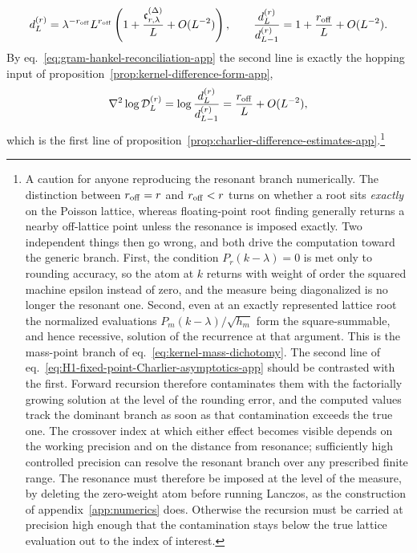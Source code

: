 \documentclass[a4paper,11pt]{article}
\theoremstyle{definition}
\theoremstyle{remark}
\begin{document}
\begin{equation}
   d_L^{(r)}
   =\lambda^{-r_{\rm off}}L^{r_{\rm off}}
   \left(
      1+\frac{\mathfrak c_{r,\lambda}^{(\Delta)}}{L}+O(L^{-2})
   \right),
   \qquad
   \frac{d_L^{(r)}}{d_{L-1}^{(r)}}
   =1+\frac{r_{\rm off}}{L}+O(L^{-2}).
   \label{eq:H1-Delta-ratio-asymptotics-app}
\end{equation}
By eq.~\eqref{eq:gram-hankel-reconciliation-app} the second line is exactly the hopping
input of proposition~\ref{prop:kernel-difference-form-app},
\begin{equation}
   \nabla^2\log\mathcal D_L^{(r)}
   =\log\frac{d_L^{(r)}}{d_{L-1}^{(r)}}
   =\frac{r_{\rm off}}{L}+O(L^{-2}),
   \label{eq:kernel-second-difference-charlier-app}
\end{equation}
which is the first line of proposition~\ref{prop:charlier-difference-estimates-app}.\footnote{A caution for anyone reproducing the resonant branch numerically.
The distinction between $r_{\rm off}=r$ and $r_{\rm off}<r$ turns on whether a root sits
\emph{exactly} on the Poisson lattice, %
whereas floating-point root finding generally returns a nearby off-lattice point unless the
resonance is imposed exactly. Two
independent things then go wrong, and both drive the computation toward the generic branch.
First, the condition $P_r(k-\lambda)=0$ is met only to rounding accuracy, so the atom at $k$
returns with weight of order the squared machine epsilon instead of zero, and the measure being
diagonalized is no longer the resonant one. Second, even at an exactly represented lattice root
the normalized evaluations $P_m(k-\lambda)/\sqrt{h_m}$ form the square-summable, and hence recessive, solution of the recurrence at that argument. This is the mass-point branch of eq.~\eqref{eq:kernel-mass-dichotomy}.  The second line of eq.~\eqref{eq:H1-fixed-point-Charlier-asymptotics-app} should be contrasted with the first. Forward recursion therefore contaminates them with the factorially growing solution at the level of the rounding
error, and the computed values track the dominant branch as soon as that contamination exceeds the
true one. %
The crossover index at which either effect becomes visible depends on the working precision
and on the distance from resonance; sufficiently high controlled precision can resolve the
resonant branch over any prescribed finite range. The resonance must therefore be imposed at the level of the measure, by deleting
the zero-weight atom before running Lanczos, as the construction of
appendix~\ref{app:numerics} does. Otherwise the recursion must be carried at precision high enough that
the contamination stays below the true lattice evaluation out to the index of interest.} %
\end{document}
